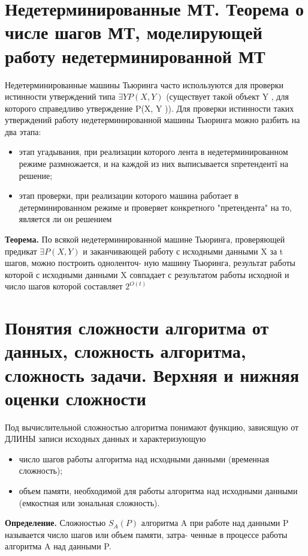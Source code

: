 \documentclass[40pt]{article}
\begin{document}
\section{Недетерминированные МТ.  Теорема о числе шагов МТ, моделирующей работу недетерминированной МТ}

Недетерминированные машины Тьюринга часто используются
для проверки истинности утверждений типа $\exists Y P(X, Y )$ (существует такой объект Y , для которого справедливо утверждение P(X, Y )).
Для проверки истинности таких утверждений работу недетерминированной машины Тьюринга можно разбить на два этапа:
\begin{itemize}
    \item этап угадывания, при реализации которого лента в недетерминированном режиме размножается, и на каждой из них выписывается ѕпретендентї на решение;
    \item этап проверки, при реализации которого машина работает в
детерминированном режиме и проверяет конкретного "претендента"
на то, является ли он решением
\end{itemize}

\textbf{Теорема.} По всякой недетерминированной машине Тьюринга, проверяющей предикат $\exists P(X, Y )$ и заканчивающей работу с
исходными данными X за t шагов, можно построить одноленточ-
ную машину Тьюринга, результат работы которой с исходными
данными X совпадает с результатом работы исходной и число шагов которой составляет $2^{O(t)}$

\section{Понятия сложности алгоритма от данных, сложность алгоритма, сложность задачи. Верхняя и нижняя оценки сложности}

Под вычислительной сложностью алгоритма понимают функцию, зависящую от ДЛИНЫ записи исходных данных и характеризующую
\begin{itemize}
    \item число шагов работы алгоритма над исходными данными (временная сложность);
    \item объем памяти, необходимой для работы алгоритма над исходными данными (емкостная или зональная сложность).
\end{itemize} 

\textbf{Определение.} Сложностью $S_A(P)$ алгоритма A при работе
над данными P называется число шагов или объем памяти, затра-
ченные в процессе работы алгоритма A над данными P.
\end{document}
